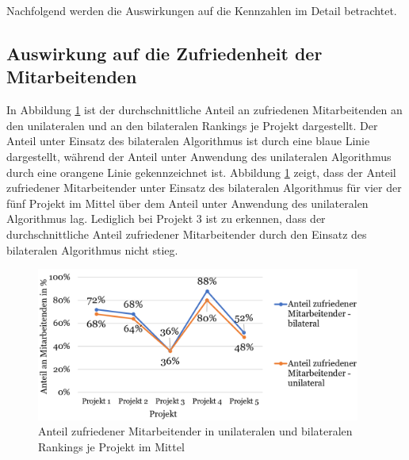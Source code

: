 Nachfolgend werden die Auswirkungen auf die Kennzahlen im Detail betrachtet.

\subsection{Auswirkung auf die Zufriedenheit der Mitarbeitenden}
In Abbildung \ref{fig:ergebnisse:abb8} ist der durchschnittliche Anteil an zufriedenen Mitarbeitenden an den unilateralen und an den bilateralen Rankings je Projekt dargestellt.
Der Anteil unter Einsatz des bilateralen Algorithmus ist durch eine blaue Linie dargestellt, während der Anteil unter Anwendung des unilateralen Algorithmus durch eine orangene Linie gekennzeichnet ist.
Abbildung \ref{fig:ergebnisse:abb8} zeigt, dass der Anteil zufriedener Mitarbeitender unter Einsatz des bilateralen Algorithmus für vier der fünf Projekt im Mittel über dem Anteil unter Anwendung des unilateralen Algorithmus lag.
Lediglich bei Projekt 3 ist zu erkennen, dass der durchschnittliche Anteil zufriedener Mitarbeitender durch den Einsatz des bilateralen Algorithmus nicht stieg.

\begin{figure}[H]
    \centering
	\includegraphics[width=0.95\textwidth]{gfx/verhaeltnis-z-durchschnitt-projekte.png}
	\caption[Anteil zufriedener Mitarbeitender in unilateralen und bilateralen Rankings je Projekt im Mittel]{Anteil zufriedener Mitarbeitender in unilateralen und bilateralen Rankings je Projekt im Mittel}
	\label{fig:ergebnisse:abb8}
\end{figure}


